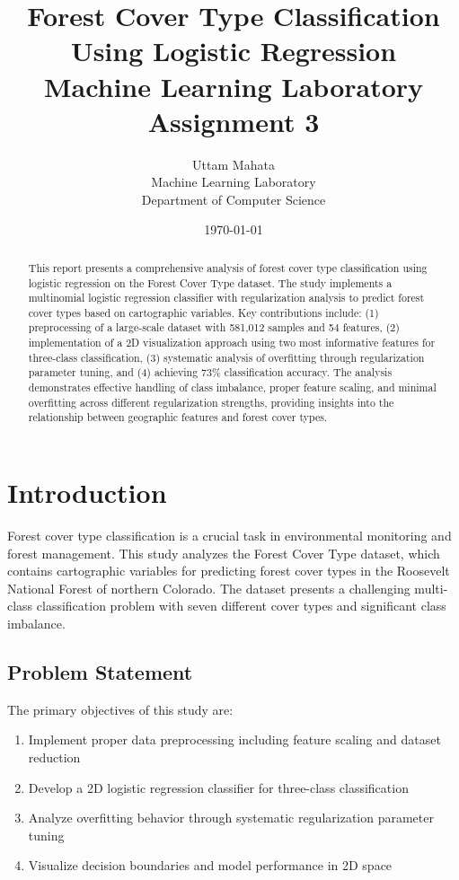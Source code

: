 \documentclass[12pt,a4paper]{article}
\title{\textbf{Forest Cover Type Classification Using Logistic Regression} \\ 
       \large Machine Learning Laboratory Assignment 3}
\author{Uttam Mahata \\ 
        Machine Learning Laboratory \\ 
        Department of Computer Science}
\date{\today}
\begin{document}
\maketitle

\begin{abstract}
This report presents a comprehensive analysis of forest cover type classification using logistic regression on the Forest Cover Type dataset. The study implements a multinomial logistic regression classifier with regularization analysis to predict forest cover types based on cartographic variables. Key contributions include: (1) preprocessing of a large-scale dataset with 581,012 samples and 54 features, (2) implementation of a 2D visualization approach using two most informative features for three-class classification, (3) systematic analysis of overfitting through regularization parameter tuning, and (4) achieving 73\% classification accuracy. The analysis demonstrates effective handling of class imbalance, proper feature scaling, and minimal overfitting across different regularization strengths, providing insights into the relationship between geographic features and forest cover types.
\end{abstract}

\tableofcontents
\newpage

\section{Introduction}

Forest cover type classification is a crucial task in environmental monitoring and forest management. This study analyzes the Forest Cover Type dataset, which contains cartographic variables for predicting forest cover types in the Roosevelt National Forest of northern Colorado. The dataset presents a challenging multi-class classification problem with seven different cover types and significant class imbalance.

\subsection{Problem Statement}
The primary objectives of this study are:
\begin{enumerate}
    \item Implement proper data preprocessing including feature scaling and dataset reduction
    \item Develop a 2D logistic regression classifier for three-class classification
    \item Analyze overfitting behavior through systematic regularization parameter tuning
    \item Visualize decision boundaries and model performance in 2D space
\end{enumerate}
\end{document}
